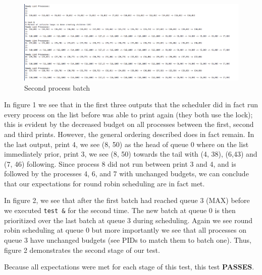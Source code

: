 \documentclass[11pt,letterpaper]{report}
\begin{document}
\begin{figure}[h]
\centering
\includegraphics[width=0.8\linewidth]{rr-1.png}
\caption{Second process batch}
\label{fig:5}
\end{figure}

In figure 1 we see that in the first three outputs that the scheduler did in fact run every process on the list before  was able to print again (they both use the lock); this is evident by the decreased budget on all processes between the first, second and third prints. However, the general ordering described does in fact remain. In the last output, print 4, we see (8, 50) as the head of queue 0 where on the list immediately prior, print 3, we see (8, 50) towards the tail with (4, 38), (6,43) and (7, 46) following. Since process 8 did not run between print 3 and 4, and is followed by the processes 4, 6, and 7 with unchanged budgets, we can conclude
that our expectations for round robin scheduling are in fact met.

In figure 2, we see that after the first batch had reached queue 3 (MAX) before we executed {\tt test \&} for the second time. The new batch at queue 0 is then prioritized over the last batch at queue 3 during scheduling. Again we see round robin scheduling
at queue 0 but more importantly we see that all processes on queue 3 have unchanged budgets (see PIDs to match them to batch one). Thus, figure 2 demonstrates the second stage of our test.

Because all expectations were met for each stage of this test, this test \textbf{PASSES}.
\end{document}
